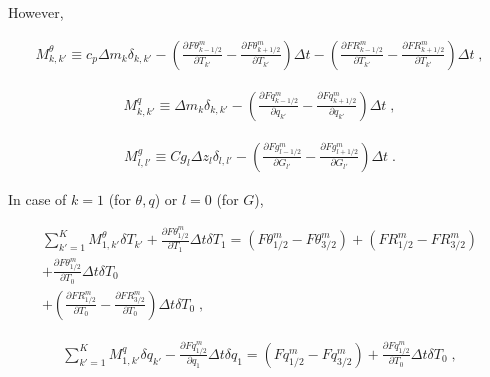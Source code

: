 However,

\begin{eqnarray}
M^{\theta}_{k,k'} \equiv c_p \Delta m_k \delta_{k,k'}
          -  \left(  \frac{\partial{F\theta^{m}_{k-1/2}}}{\partial {T_{k'}}}
                   - \frac{\partial{F\theta^{m}_{k+1/2}}}{\partial {T_{k'}}} \right) \Delta t
          -  \left(  \frac{\partial{FR^{m}_{k-1/2}}}{\partial {T_{k'}}}
                   - \frac{\partial{FR^{m}_{k+1/2}}}{\partial {T_{k'}}} \right) \Delta t \; ,
\end{eqnarray}

\begin{eqnarray}
M^{q}_{k,k'} \equiv \Delta m_k \delta_{k,k'}
          -  \left(  \frac{\partial{Fq^{m}_{k-1/2}}}{\partial {q_{k'}}}
                   - \frac{\partial{Fq^{m}_{k+1/2}}}{\partial {q_{k'}}} \right) \Delta t \; ,
\end{eqnarray}

\begin{eqnarray}
M^{g}_{l,l'} \equiv Cg_l \Delta z_l \delta_{l,l'}
          -  \left(  \frac{\partial{Fg^{m}_{l-1/2}}}{\partial {G_{l'}}}
                   - \frac{\partial{Fg^{m}_{l+1/2}}}{\partial {G_{l'}}} \right) \Delta t \; .
\end{eqnarray}

In case of \(k=1\) (for \(\theta, q\)) or \(l=0\) (for \(G\)),

\begin{eqnarray}
    \sum_{k'=1}^{K}  M^\theta_{1,k'} \delta T_{k'}
  +  \frac{\partial{F\theta^{m}_{1/2}}}{\partial {T_1}} \Delta t\delta T_1
        =  (F\theta^{m}_{1/2} - F\theta^{m}_{3/2})
        + (FR^{m}_{1/2} - FR^{m}_{3/2})   \\
 +   \frac{\partial{F\theta^{m}_{1/2}}}{\partial {T_0}} \Delta t\delta T_0
      \\
 +  \left(\frac{\partial{FR^{m}_{1/2}}}{\partial {T_0}} - \frac{\partial{FR^{m}_{3/2}}}{\partial {T_0}} \right)
     \Delta t\delta T_0 \; ,
\end{eqnarray}

\begin{eqnarray}
 \sum_{k'=1}^{K}  M^q_{1,k'} \delta q_{k'}
         - \frac{\partial{Fq^{m}_{1/2}}}{\partial {q_1}} \Delta t\delta q_1
         = (Fq^{m}_{1/2} - Fq^{m}_{3/2})
         + \frac{\partial{Fq^{m}_{1/2}}}{\partial {T_0}} \Delta t\delta T_0 \; ,
\end{eqnarray}

